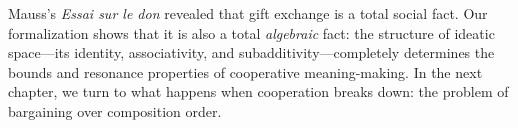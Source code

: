 Mauss's \textit{Essai sur le don} revealed that gift exchange is a total
social fact.  Our formalization shows that it is also a total \emph{algebraic}
fact: the structure of ideatic space---its identity, associativity, and
subadditivity---completely determines the bounds and resonance properties
of cooperative meaning-making.  In the next chapter, we turn to what happens
when cooperation breaks down: the problem of bargaining over composition order.
